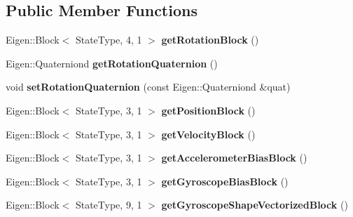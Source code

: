 \subsection*{Public Member Functions}
\begin{DoxyCompactItemize}
\item 
\hypertarget{class_filter_state_a549088ec74cb2262e397b929abc174d2}{Eigen\-::\-Block$<$ State\-Type, 4, 1 $>$ {\bfseries get\-Rotation\-Block} ()}\label{class_filter_state_a549088ec74cb2262e397b929abc174d2}

\item 
\hypertarget{class_filter_state_a5f61beb08bf43811cebea645c80949ac}{Eigen\-::\-Quaterniond {\bfseries get\-Rotation\-Quaternion} ()}\label{class_filter_state_a5f61beb08bf43811cebea645c80949ac}

\item 
\hypertarget{class_filter_state_ab2a6e477d01da9521267781a73757838}{void {\bfseries set\-Rotation\-Quaternion} (const Eigen\-::\-Quaterniond \&quat)}\label{class_filter_state_ab2a6e477d01da9521267781a73757838}

\item 
\hypertarget{class_filter_state_af2dd9af9a0722a05cbc59981cf40aead}{Eigen\-::\-Block$<$ State\-Type, 3, 1 $>$ {\bfseries get\-Position\-Block} ()}\label{class_filter_state_af2dd9af9a0722a05cbc59981cf40aead}

\item 
\hypertarget{class_filter_state_a239c2732f1a3d647c21b96f5d53dd215}{Eigen\-::\-Block$<$ State\-Type, 3, 1 $>$ {\bfseries get\-Velocity\-Block} ()}\label{class_filter_state_a239c2732f1a3d647c21b96f5d53dd215}

\item 
\hypertarget{class_filter_state_a43b485d8c02d6eb8e37cd8f2323e9e43}{Eigen\-::\-Block$<$ State\-Type, 3, 1 $>$ {\bfseries get\-Accelerometer\-Bias\-Block} ()}\label{class_filter_state_a43b485d8c02d6eb8e37cd8f2323e9e43}

\item 
\hypertarget{class_filter_state_a8bb562801b8b34026dad74bd4223c06e}{Eigen\-::\-Block$<$ State\-Type, 3, 1 $>$ {\bfseries get\-Gyroscope\-Bias\-Block} ()}\label{class_filter_state_a8bb562801b8b34026dad74bd4223c06e}

\item 
\hypertarget{class_filter_state_a8686bb8e54e2e9902c28095f8c623745}{Eigen\-::\-Block$<$ State\-Type, 9, 1 $>$ {\bfseries get\-Gyroscope\-Shape\-Vectorized\-Block} ()}\label{class_filter_state_a8686bb8e54e2e9902c28095f8c623745}


\end{DoxyCompactItemize}

